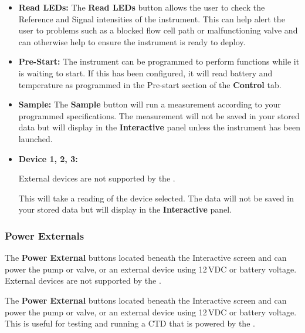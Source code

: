 \begin{itemize}
    \item[] \textbf{Read LEDs:}
    The \textbf{Read LEDs} button allows the user to check the Reference and Signal intensities of the instrument.  This can help alert the user to problems such as a blocked flow cell path or malfunctioning valve and can otherwise help to ensure the instrument is ready to deploy.
    
    \item[] \textbf{Pre-Start:}
    The instrument can be programmed to perform functions while it is waiting to start.  If this has been configured, it will read battery and temperature as programmed in the Pre-start section of the \textbf{Control} tab.
    
    \item[] \textbf{Sample:}
    The \textbf{Sample} button will run a measurement according to your programmed specifications. The measurement will not be saved in your stored data but will display in the \textbf{Interactive} panel unless the instrument has been launched.
    
    \item[] \textbf{Device 1, 2, 3:}
    \ifcase \inst	%
    
    External devices are not supported by the \instType{}.
    
    \or			%

    This will take a reading of the device selected.  The data will not be saved in your stored data but will display in the \textbf{Interactive} panel.
    
    \fi
\end{itemize}


\subsubsection{Power Externals}

\ifcase \inst	%

The \textbf{Power External} buttons located beneath the Interactive screen and can power the pump or valve, or an external device using 12\,VDC or battery voltage. External devices are not supported by the \instType{}. 

\or			%

The \textbf{Power External} buttons located beneath the Interactive screen and can power the pump or valve, or an external device using 12\,VDC or battery voltage.  This is useful for testing and running a CTD that is powered by the \instType{}.

